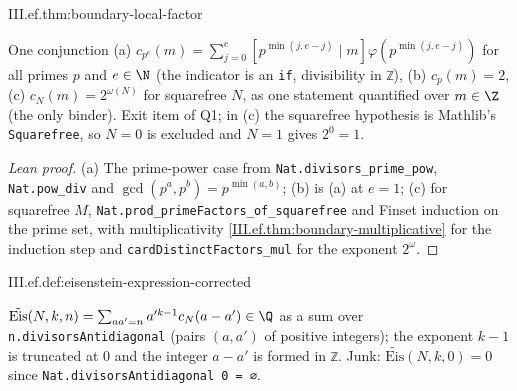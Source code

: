 \begin{theorem}
\end{theorem}
\begin{tfformal}{III.ef.thm:boundary-local-factor}
\begin{tffidelity}
One conjunction (a) $c_{p^e}(m)=\sum_{j=0}^{e}[p^{\min(j,e-j)}\mid m]\varphi(p^{\min(j,e-j)})$ for all primes $p$ and $e\in\N$ (the indicator is an \texttt{if}, divisibility in \texttt{ℤ}), (b) $c_p(m)=2$, (c) $c_N(m)=2^{\omega(N)}$ for squarefree $N$, as one statement quantified over $m\in\Z$ (the only binder). Exit item of Q1; in (c) the squarefree hypothesis is Mathlib's \texttt{Squarefree}, so $N=0$ is excluded and $N=1$ gives $2^0=1$.
\end{tffidelity}
\end{tfformal}
\begin{proof}[Lean proof]
(a) The prime-power case from \texttt{Nat.divisors\_prime\_pow}, \texttt{Nat.pow\_div} and $\gcd(p^a,p^b)=p^{\min(a,b)}$; (b) is (a) at $e=1$; (c) for squarefree $M$, \texttt{Nat.prod\_primeFactors\_of\_squarefree} and Finset induction on the prime set, with multiplicativity \cref{III.ef.thm:boundary-multiplicative} for the induction step and \texttt{cardDistinctFactors\_mul} for the exponent $2^{\omega}$.
\end{proof}

\begin{definition}
\end{definition}
\begin{tfformal}{III.ef.def:eisenstein-expression-corrected}
\begin{tffidelity}
$\tilde{\mathrm{Eis}}(N,k,n)=\sum_{aa'=n}a'^{k-1}c_N(a-a')\in\Q$ as a sum over \texttt{n.divisorsAntidiagonal} (pairs $(a,a')$ of positive integers); the exponent $k-1$ is truncated at $0$ and the integer $a-a'$ is formed in \texttt{ℤ}. Junk: $\tilde{\mathrm{Eis}}(N,k,0)=0$ since \texttt{Nat.divisorsAntidiagonal 0 = ∅}.
\end{tffidelity}
\end{tfformal}

